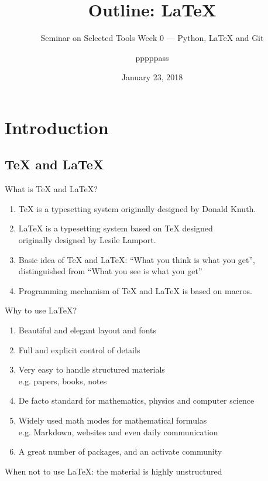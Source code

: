 \documentclass[english, nochinese]{../TeXTemplate/pkuslide}
\title{Outline: \texorpdfstring{\LaTeX}{LaTeX}}
\subtitle{Seminar on Selected Tools Week 0 --- Python, \texorpdfstring{\LaTeX}{LaTeX} and Git}
\author{pppppass}
\date{January 23, 2018}
\begin{document}
\begin{frame}
\titlepage
\end{frame}

\begin{frame}
\tableofcontents[subsectionstyle=show]
\end{frame}

\section{Introduction}

\begin{frame}
\sectionpage
\end{frame}

\subsection{\TeX{} and \LaTeX}

\begin{frame}{What is \TeX{} and \LaTeX?}
\begin{enumerate}
\item \TeX{} is a typesetting system originally designed by Donald Knuth.
\item \LaTeX{} is a typesetting system based on \TeX{} designed \\
originally designed by Lesile Lamport.
\item Basic idea of \TeX{} and \LaTeX{}: ``What you think is what you get'', \\ distinguished from ``What you see is what you get''
\item Programming mechanism of \TeX{} and \LaTeX{} is based on macros.
\end{enumerate}
\end{frame}

\begin{frame}{Why to use \LaTeX?}
\begin{enumerate}
\item Beautiful and elegant layout and fonts
\item Full and explicit control of details
\item Very easy to handle structured materials \\
e.g. papers, books, notes
\item De facto standard for mathematics, physics and computer science
\item Widely used math modes for mathematical formulas \\
e.g. Markdown, websites and even daily communication
\item A great number of packages, and an activate community
\end{enumerate}

When not to use \LaTeX{}: the material is highly unstructured
\end{frame}
\end{document}
